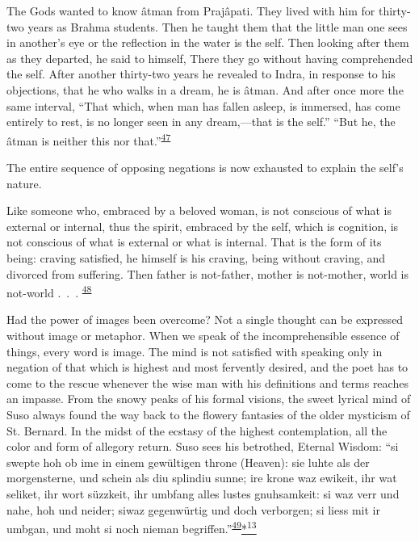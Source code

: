 The Gods wanted to know âtman from Prajâpati. They lived with him for
thirty-two years as Brahma students. Then he taught them that the little
man one sees in another's eye or the reflection in the water is the
self. Then looking after them as they departed, he said to himself,
There they go without having comprehended the self. After another
thirty-two years he revealed to Indra, in response to his objections,
that he who walks in a dream, he is âtman. And after once more the same
interval, ``That which, when man has fallen asleep, is immersed, has
come entirely to rest, is no longer seen in any dream,---that is the
self.'' ``But he, the âtman is neither this nor
that.''\textsuperscript{\protect\hypertarget{17_Chapter_Ten__THE_FAILURE_OF_IMAG.xhtmlux5cux23id_643}{\protect\hyperlink{23_NOTES.xhtmlux5cux23id_644}{47}}}

The entire sequence of opposing negations is now exhausted to explain
the self's nature.

Like someone who, embraced by a beloved woman, is not conscious of what
is external or internal, thus the spirit, embraced by the self, which is
cognition, is not conscious of what is external or what is internal.
That is the form of its being: craving satisfied, he himself is his
craving, being without craving, and divorced from suffering. Then father
is not-father, mother is not-mother, world is not-world .~.~.
\textsuperscript{\protect\hypertarget{17_Chapter_Ten__THE_FAILURE_OF_IMAG.xhtmlux5cux23id_641}{\protect\hyperlink{23_NOTES.xhtmlux5cux23id_642}{48}}}

Had the power of images been overcome? Not a single thought can be
expressed without image or metaphor. When we speak of the
incomprehensible essence of things, every word is image. The mind is not
satisfied with speaking only in negation of that which is highest and
most fervently desired, and the poet has to come to the rescue whenever
the wise man with his definitions and terms reaches an impasse. From the
snowy peaks of his formal visions, the sweet lyrical mind of Suso always
found the way back to the flowery fantasies of the older mysticism of
St. Bernard. In the midst of the ecstasy of the highest contemplation,
all the color and form of allegory return. Suso sees his betrothed,
Eternal Wisdom: ``si swepte hoh ob ime in einem gewültigen throne
(Heaven): sie luhte als der morgensterne, und schein als diu splindiu
sunne; ire krone waz ewikeit, ihr wat seliket, ihr wort süzzkeit, ihr
umbfang alles lustes gnuhsamkeit: si waz verr und nahe, hoh und neider;
si\protect\hypertarget{17_Chapter_Ten__THE_FAILURE_OF_IMAG.xhtmlux5cux23page_264}{}{}waz
gegenwürtig und doch verborgen; si liess mit ir umbgan, und moht si noch
nieman
begriffen.''\textsuperscript{\protect\hypertarget{17_Chapter_Ten__THE_FAILURE_OF_IMAG.xhtmlux5cux23id_639}{\protect\hyperlink{23_NOTES.xhtmlux5cux23id_640}{49}}}\protect\hypertarget{17_Chapter_Ten__THE_FAILURE_OF_IMAG.xhtmlux5cux23id_2603}{\protect\hyperlink{23_NOTES.xhtmlux5cux23id_2604}{*\textsuperscript{13}}}

